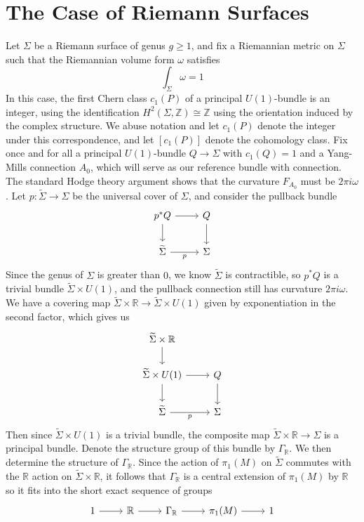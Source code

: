 \documentclass[psamsfonts, 12pt]{amsart}
\theoremstyle{definition}
\theoremstyle{remark}
\newcommand{\R}{\mathbb{R}}
\newcommand{\Z}{\mathbb{Z}}
\begin{document}
\section{The Case of Riemann Surfaces}
%
Let $\Sigma$ be a Riemann surface of genus $g \geq 1$, and fix a Riemannian metric
on $\Sigma$ such that the Riemannian volume form $\omega$ satisfies
\[
\int_\Sigma \omega = 1
\]
In this case, the first Chern class $c_1(P)$ of a principal $U(1)$-bundle is an integer,
using the identification $H^2(\Sigma,\Z) \cong \Z$ using the orientation induced by the
complex structure. We abuse notation and let $c_1(P)$ denote the integer under this
correspondence, and let $[c_1(P)]$ denote the cohomology class. Fix once and for
all a principal $U(1)$-bundle $Q \to \Sigma$ with $c_1(Q) = 1$ and a Yang-Mills connection
$A_0$, which will serve as our reference bundle with connection. The standard Hodge
theory argument shows that the curvature $F_{A_0}$ must be $2\pi i\omega$.
Let $p : \widetilde{\Sigma} \to \Sigma$ be the universal cover of $\Sigma$, and consider
the pullback bundle
\[\begin{tikzcd}
p^*Q \ar[d]\ar[r] & Q \ar[d]\\
\widetilde{\Sigma} \ar[r, "p"'] & \Sigma
\end{tikzcd}\]
Since the genus of $\Sigma$ is greater than $0$, we know $\widetilde{\Sigma}$ is
contractible, so $p^*Q$ is a trivial bundle $\widetilde{\Sigma} \times U(1)$, and
the pullback connection still has curvature $2\pi i \omega$. We have a covering
map $\widetilde{\Sigma} \times \R \to \widetilde{\Sigma} \times U(1)$ given
by exponentiation in the second factor, which gives us
\[\begin{tikzcd}
\widetilde{\Sigma} \times \R \ar[d] \\
\widetilde{\Sigma} \times U(1) \ar[d]\ar[r] & Q \ar[d]\\
\widetilde{\Sigma} \ar[r, "p"'] & \Sigma
\end{tikzcd}\]
Then since $\widetilde{\Sigma} \times U(1)$ is a trivial bundle, the composite
map $\widetilde{\Sigma} \times \R \to \Sigma$ is a principal bundle. Denote the structure
group of this bundle by $\Gamma_\R$. We then determine the structure of $\Gamma_\R$.
Since the action of $\pi_1(M)$ on $\widetilde{\Sigma}$ commutes with the $\R$ action on
$\widetilde{\Sigma} \times \R$, it follows that $\Gamma_\R$ is a central extension of
$\pi_1(M)$ by $\R$ so it fits into the short exact sequence of groups
\[\begin{tikzcd}
1 \ar[r] & \R \ar[r] & \Gamma_\R \ar[r] & \pi_1(M) \ar[r] & 1
\end{tikzcd}\]
\end{document}
